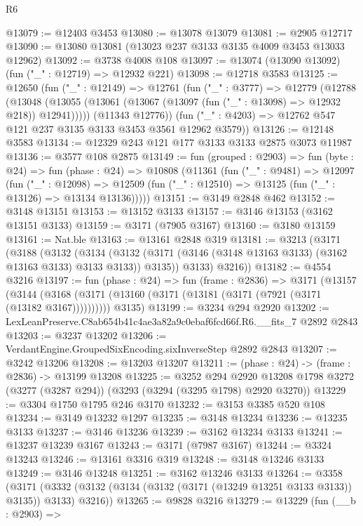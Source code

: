 \begin{lexlean}{R6}
\begin{coremodule}
@13079 := @12403 @3453
@13080 := @13078 @13079
@13081 := @2905 @12717
@13090 := @13080 @13081 (@13023 @237 @3133 @3135 @4009 @3453 @13033 @12962)
@13092 := @3738 @4008 @108
@13097 := @13074 (@13090 @13092) (fun ("_" : @12719) => @12932 @221)
@13098 := @12718 @3583
@13125 := @12650
    (fun ("_" : @12149) =>
    @12761
      (fun ("_" : @3777) =>
      @12779
        (@12788
          (@13048 (@13055 (@13061 (@13067 (@13097 (fun ("_" : @13098) => @12932 @218)) @12941)))))
        (@11343 @12776))
      (fun ("_" : @4203) => @12762 @547 @121 @237 @3135 @3133 @3453 @3561 @12962 @3579))
@13126 := @12148 @3583
@13134 := @12329 @243 @121 @177 @3133 @3133 @2875 @3073 @11987
@13136 := @3577 @108 @2875
@13149 := fun (grouped : @2903) =>
  fun (byte : @24) =>
  fun (phase : @24) =>
  @10808
    (@11361
      (fun ("_" : @9481) =>
      @12097
        (fun ("_" : @12098) =>
        @12509 (fun ("_" : @12510) => @13125 (fun ("_" : @13126) => @13134 @13136)))))
@13151 := @3149 @2848 @462
@13152 := @3148 @13151
@13153 := @13152 @3133
@13157 := @3146 @13153 (@3162 @13151 @3133)
@13159 := @3171 (@7905 @3167)
@13160 := @3180 @13159
@13161 := Nat.ble
@13163 := @13161 @2848 @319
@13181 := @3213
    (@3171
      (@3188
        (@3132
          (@3134
            (@3132 (@3171 (@3146 (@3148 @13163 @3133) (@3162 @13163 @3133) @3133 @3133)) @3135))
          @3133)
        @3216))
@13182 := @4554 @3216
@13197 := fun (phase : @24) =>
  fun (frame : @2836) =>
  @3171
    (@13157
      (@3144 (@3168 (@3171 (@13160 (@3171 (@13181 (@3171 (@7921 (@3171 (@13182 @3167))))))))))
      @3135)
@13199 := @3234 @294 @2920
@13202 := LexLeanPreserve.C8ab654b41c4ae3a82a9c0ebaf6fcd66f.R6.__fits_7 @2892 @2843
@13203 := @3237 @13202
@13206 := VerdantEngine.GroupedSixEncoding.sixInverseStep @2892 @2843
@13207 := @3242 @13206
@13208 := @13203 @13207
@13211 := (phase : @24) -> (frame : @2836) -> @13199 @13208
@13225 := @3252
    @294
    @2920
    @13208
    @1798
    @3272
    (@3277 (@3287 @294))
    (@3293 (@3294 (@3295 @1798) @2920 @3270))
@13229 := @3304 @1750 @1795 @246 @3170
@13232 := @3153 @3385 @520 @108
@13234 := @3149 @13232 @1297
@13235 := @3148 @13234
@13236 := @13235 @3133
@13237 := @3146 @13236
@13239 := @3162 @13234 @3133
@13241 := @13237 @13239 @3167
@13243 := @3171 (@7987 @3167)
@13244 := @3324 @13243
@13246 := @13161 @3316 @319
@13248 := @3148 @13246 @3133
@13249 := @3146 @13248
@13251 := @3162 @13246 @3133
@13264 := @3358
    (@3171 (@3332 (@3132 (@3134 (@3132 (@3171 (@13249 @13251 @3133 @3133)) @3135)) @3133) @3216))
@13265 := @9828 @3216
@13279 := @13229
    (fun (__b : @2903) =>

\end{coremodule}
\end{lexlean}
